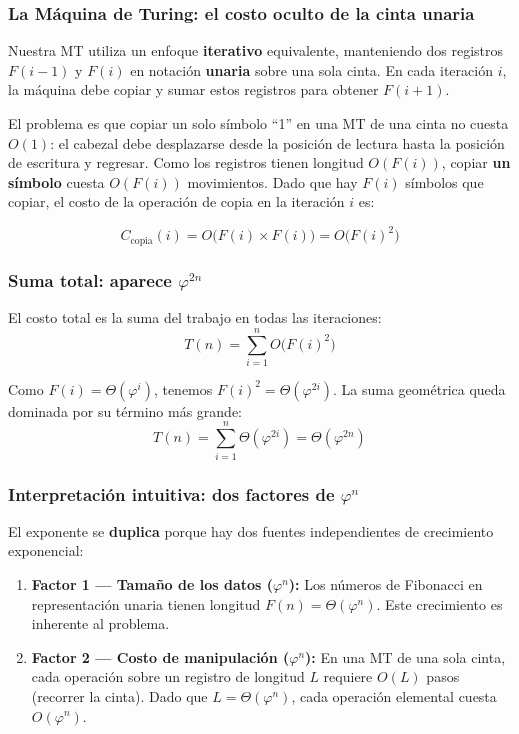 \documentclass[12pt,a4paper]{article}
\begin{document}
\subsubsection{La Máquina de Turing: el costo oculto de la cinta unaria}

Nuestra MT utiliza un enfoque \textbf{iterativo} equivalente, manteniendo dos registros $F(i-1)$ y $F(i)$ en notación \textbf{unaria} sobre una sola cinta. En cada iteración $i$, la máquina debe copiar y sumar estos registros para obtener $F(i+1)$.

El problema es que copiar un solo símbolo ``1'' en una MT de una cinta no cuesta $O(1)$: el cabezal debe desplazarse desde la posición de lectura hasta la posición de escritura y regresar. Como los registros tienen longitud $O(F(i))$, copiar \textbf{un símbolo} cuesta $O(F(i))$ movimientos. Dado que hay $F(i)$ símbolos que copiar, el costo de la operación de copia en la iteración $i$ es:

$$C_{\text{copia}}(i) = O\big(F(i) \times F(i)\big) = O\big(F(i)^2\big)$$

\subsubsection{Suma total: aparece $\varphi^{2n}$}

El costo total es la suma del trabajo en todas las iteraciones:
$$T(n) = \sum_{i=1}^{n} O\big(F(i)^2\big)$$

Como $F(i) = \Theta(\varphi^i)$, tenemos $F(i)^2 = \Theta(\varphi^{2i})$. La suma geométrica queda dominada por su término más grande:
$$T(n) = \sum_{i=1}^{n} \Theta(\varphi^{2i}) = \Theta(\varphi^{2n})$$

\subsubsection{Interpretación intuitiva: dos factores de $\varphi^n$}

El exponente se \textbf{duplica} porque hay dos fuentes independientes de crecimiento exponencial:

\begin{enumerate}
    \item \textbf{Factor 1 --- Tamaño de los datos ($\varphi^n$):} Los números de Fibonacci en representación unaria tienen longitud $F(n) = \Theta(\varphi^n)$. Este crecimiento es inherente al problema.
    
    \item \textbf{Factor 2 --- Costo de manipulación ($\varphi^n$):} En una MT de una sola cinta, cada operación sobre un registro de longitud $L$ requiere $O(L)$ pasos (recorrer la cinta). Dado que $L = \Theta(\varphi^n)$, cada operación elemental cuesta $O(\varphi^n)$.
\end{enumerate}
\end{document}
